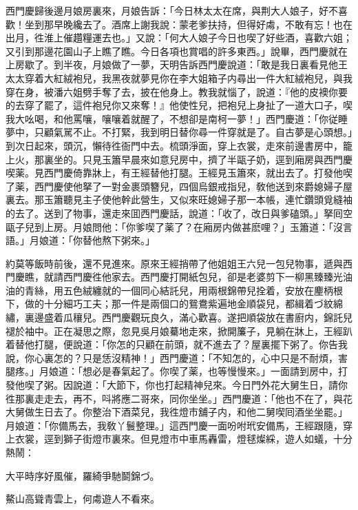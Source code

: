 西門慶歸後邊月娘房裏來，月娘告訴：「今日林太太在席，與荆大人娘子，好不喜歡！坐到那早晚纔去了。酒席上謝我說：蒙老爹扶持，但得好䖏，不敢有忘！也在出月，徃淮上催趲糧運去也。」又說：「何大人娘子今日也喫了好些酒，喜歡六姐；又引到那邊花園山子上瞧了瞧。今日各項也賞唱的許多東西。」說畢，西門慶就在上房歇了。到半夜，月娘做了一夢，天明告訴西門慶說道：「敢是我日裏看見他王太太穿着大紅絨袍兒，我黑夜就夢見你在李大姐箱子内尋出一件大紅絨袍兒，與我穿在身，被潘六姐劈手奪了去，披在他身上。教我就惱了，說道：『他的皮襖你要的去穿了罷了，這件袍兒你又來奪！』他使性兒，把袍兒上身扯了一道大口子，喫我大吆喝，和他罵嚷，嚷嚷着就醒了，不想卻是南柯一夢！」西門慶道：「你従睡夢中，只顧氣駡不止。不打緊，我到明日替你尋一件穿就是了。自古夢是心頭想。」到次日起來，頭沉，懶待徃衙門中去。梳頭淨面，穿上衣裳，走來前邊書房中，籠上火，那裏坐的。只見玉簫早晨來如意兒房中，擠了半甌子奶，逕到廂房與西門慶喫薬。見西門慶倚靠牀上，有王經替他打腿。王經見玉簫來，就出去了。打發他喫了薬，西門慶使他拏了一對金裹頭簪兒，四個烏銀戒指兒，敎他送到來爵媳婦子屋裏去。那玉簫聽見主子使他幹此營生，又似來旺媳婦子那一本帳，連忙鑽頭覓縫袖的去了。送到了物事，還走來囬西門慶話，說道：「收了，改日與爹磕頭。」拏囘空甌子兒到上房。月娘問他：「你爹喫了薬了？在廂房内做甚麽哩？」玉簫道：「沒言語。」月娘道：「你替他熬下粥來。」

約莫等飯時前後，還不見進來。原來王經捎帶了他姐姐王六兒一包兒物事，遞與西門慶瞧，就請西門慶徃他家去。西門慶打開紙包兒，卻是老婆剪下一柳黑臻臻光油油的青絲，用五色絨纏就的一個同心結託兒，用兩根錦帶兒拴着，安放在麈柄根下，做的十分細巧工夫；那一件是兩個口的鴛鴦紫遍地金順袋兒，都緝着づ紋綿繡，裏邊盛着瓜穰兒。西門慶觀玩良久，滿心歡喜。遂把順袋放在書廚内，錦託兒褪於袖中。正在凝思之際，忽見吳月娘驀地走來，掀開簾子，見躺在牀上，王經趴着替他打腿，便說道：「你怎的只顧在前頭，就不進去了？屋裏擺下粥了。你告我說，你心裏怎的？只是恁沒精神！」西門慶道：「不知怎的，心中只是不耐煩，害腿疼。」月娘道：「想必是春氣起了。你喫了薬，也等慢慢來。」一面請到房中，打發他喫了粥。因說道：「大節下，你也打起精神兒來。今日門外花大舅生日，請你徃那裏走走去，再不，呌將應二哥來，同你坐坐。」西門慶道：「他也不在了，與花大舅做生日去了。你整治下酒菜兒，我徃燈巿舖子内，和他二舅喫囘酒坐坐罷。」月娘道：「你備馬去，我敎丫鬟整理。」這西門慶一面吩咐玳安備馬，王經跟隨，穿上衣裳，逕到獅子街燈巿裏來。但見燈巿中車馬轟雷，燈毬燦綵，遊人如蟻，十分熱鬧：

\begin{myquote}
大平時序好風催，羅綺爭馳鬬錦づ。

鰲山高聳青雲上，何䖏遊人不看來。
\end{myquote}

